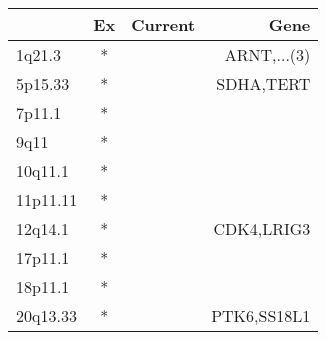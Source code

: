 \begin{tabular}{lccr}
\toprule
{} & Ex & Current &         Gene \\
\midrule
1q21.3   &  * &         &  ARNT,...(3) \\
5p15.33  &  * &         &    SDHA,TERT \\
7p11.1   &  * &         &              \\
9q11     &  * &         &              \\
10q11.1  &  * &         &              \\
11p11.11 &  * &         &              \\
12q14.1  &  * &         &   CDK4,LRIG3 \\
17p11.1  &  * &         &              \\
18p11.1  &  * &         &              \\
20q13.33 &  * &         &  PTK6,SS18L1 \\
\bottomrule
\end{tabular}
